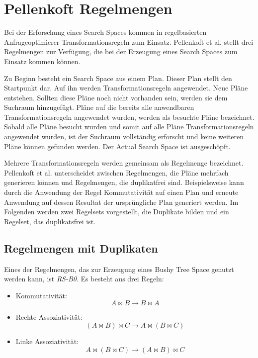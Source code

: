 \section{Pellenkoft Regelmengen}
\label{sec:pellenkoftRulesets}
Bei der Erforschung eines Search Spaces kommen in regelbasierten Anfrageoptimierer Transformationsregeln zum Einsatz. Pellenkoft et al. \cite{pellenkoft1997duplicate} \cite{manegold2000multi} \cite{pellenkoft1997complexity} stellt drei Regelmengen zur Verfügung, die bei der Erzeugung eines Search Spaces zum Einsatz kommen können.


Zu Beginn besteht ein Search Space aus einem Plan. Dieser Plan stellt den Startpunkt dar. Auf ihn werden Transformationsregeln angewendet. Neue Pläne entstehen. Sollten diese Pläne noch nicht vorhanden sein, werden sie dem Suchraum hinzugefügt. Pläne auf die bereits alle anwendbaren Transformationsregeln angewendet wurden, werden als besuchte Pläne bezeichnet. Sobald alle Pläne besucht wurden und somit auf alle Pläne Transformationsregeln angewendet wurden, ist der Suchraum vollständig erforscht und keine weiteren Pläne können gefunden werden. Der Actual Search Space ist ausgeschöpft.

Mehrere Transformationsregeln werden gemeinsam als Regelmenge bezeichnet. Pellenkoft et al. unterscheidet zwischen Regelmengen, die Pläne mehrfach generieren können und Regelmengen, die duplikatfrei sind. Beispielsweise kann durch die Anwendung der Regel Kommutativität auf einen Plan und erneute Anwendung auf dessen Resultat  der ursprüngliche Plan generiert werden. Im Folgenden werden zwei Regelsets vorgestellt, die Duplikate bilden und ein Regelset, das duplikatsfrei ist.


\subsection{Regelmengen mit Duplikaten}

Eines der Regelmengen, das zur Erzeugung eines Bushy Tree Space genutzt werden kann, ist \textit{RS-B0}. Es besteht aus drei Regeln:

\begin{itemize}
\item Kommutativität: $$ A \Join B \to B \Join A$$
\item Rechte Assoziativität: $$(A \Join B) \Join C \to A \Join (B \Join C) $$
\item Linke Assoziativität: $$A \Join (B \Join C) \to (A \Join B) \Join C$$
\end{itemize}

